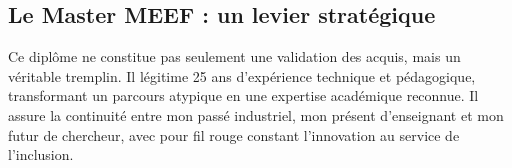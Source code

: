 \subsection{Le Master MEEF : un levier stratégique}

Ce diplôme ne constitue pas seulement une validation des acquis, mais un véritable tremplin. Il légitime 25 ans d'expérience technique et pédagogique, transformant un parcours atypique en une expertise académique reconnue. Il assure la continuité entre mon passé industriel, mon présent d'enseignant et mon futur de chercheur, avec pour fil rouge constant l'innovation au service de l'inclusion.
